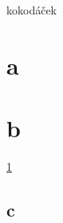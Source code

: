 \documentclass{article}
\begin{document}
kokodáček
\clearpage
\section{a}
\label{sec:a}
\section{b}
\ref{sec:a}
\subsection{c}
\end{document}
